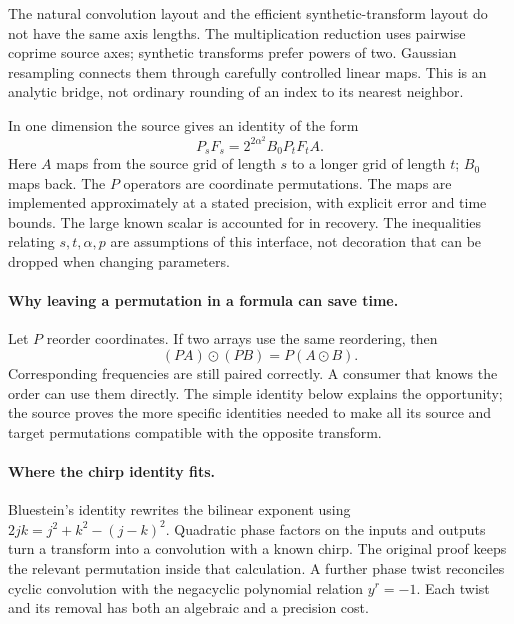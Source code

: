 
The natural convolution layout and the efficient synthetic-transform layout
do not have the same axis lengths. The multiplication reduction uses pairwise
coprime source axes; synthetic transforms prefer powers of two. Gaussian
resampling connects them through carefully controlled linear maps. This is
an analytic bridge, not ordinary rounding of an index to its nearest neighbor.

In one dimension the source gives an identity of the form
\[
 P_sF_s=2^{2\alpha^2}B_0P_tF_tA.
\]
Here $A$ maps from the source grid of length $s$ to a longer grid of length
$t$; $B_0$ maps back. The $P$ operators are coordinate permutations.
The maps are implemented approximately at a stated precision, with explicit
error and time bounds. The large known scalar is accounted for in recovery.
The inequalities relating $s,t,\alpha,p$ are assumptions of this interface,
not decoration that can be dropped when changing parameters.

\paragraph{Why leaving a permutation in a formula can save time.}
Let $P$ reorder coordinates. If two arrays use the same reordering, then
\[
 (PA)\odot(PB)=P(A\odot B).
\]
Corresponding frequencies are still paired correctly. A consumer that knows
the order can use them directly. The simple identity below explains the
opportunity; the source proves the more specific identities needed to make
all its source and target permutations compatible with the opposite transform.


\paragraph{Where the chirp identity fits.}
Bluestein's identity rewrites the bilinear exponent using
$2jk=j^2+k^2-(j-k)^2$. Quadratic phase factors on the inputs and outputs
turn a transform into a convolution with a known chirp. The original proof
keeps the relevant permutation inside that calculation. A further phase
twist reconciles cyclic convolution with the negacyclic polynomial relation
$y^r=-1$. Each twist and its removal has both an algebraic and a precision cost.

